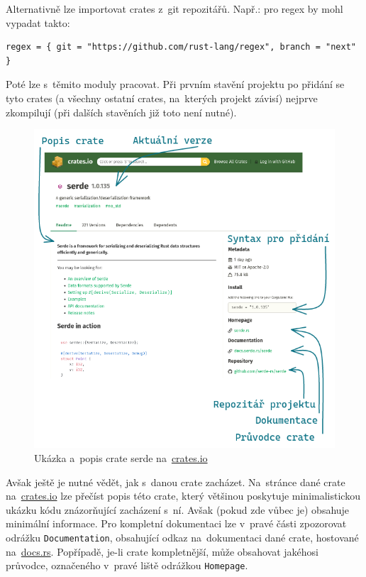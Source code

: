\documentclass[a4paper, 12pt]{article} %
\begin{document}
			Alternativně lze importovat crates z~git repozitářů. Např.: pro regex by mohl vypadat takto:
			\begin{verbatim}
regex = { git = "https://github.com/rust-lang/regex", branch = "next" }
			\end{verbatim}

			Poté lze s~těmito moduly pracovat. Při prvním stavění projektu po přidání se tyto crates (a všechny ostatní crates, na~kterých projekt závisí) nejprve zkompilují (při dalších stavěních již toto není nutné).
			
			\begin{center}
				\begin{figure}[H]
					\centering
					\includegraphics[width=0.95\linewidth]{cratesio}
					\caption{Ukázka a~popis crate serde na~\href{https://crates.io}{crates.io}}
					\label{fig:cratesio}
				\end{figure}
			\end{center}
			
			Avšak ještě je nutné vědět, jak s~danou crate zacházet. Na~stránce dané crate na~\href{https://crates.io}{crates.io} lze přečíst popis této crate, který většinou poskytuje minimalistickou ukázku kódu znázorňující zacházení s~ní. Avšak (pokud zde vůbec je) obsahuje minimální informace. Pro kompletní dokumentaci lze v~pravé části zpozorovat odrážku \texttt{Documentation}, obsahující odkaz na~dokumentaci dané crate, hostované na~\href{https://docs.rs/}{docs.rs}. Popřípadě, je-li crate kompletnější, může obsahovat jakéhosi průvodce, označeného v~pravé liště odrážkou \texttt{Homepage}.
\end{document}
